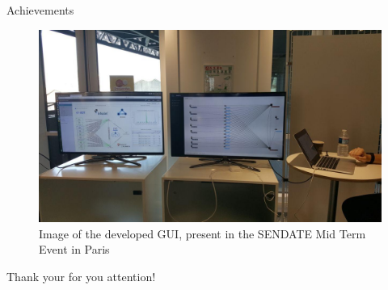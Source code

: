 \documentclass[aspectratio=43]{beamer}
\begin{document}
\begin{frame}{Achievements}
    \begin{figure}
        \includegraphics[width=.9\textwidth]{presentation/basebox_paris}
        \caption{Image of the developed GUI, present in the SENDATE Mid Term Event in Paris}
    \end{figure}
\end{frame}

\begin{frame}[plain]
\centering
    \Huge{{Thank your for you attention!}}
\end{frame}
\end{document}
